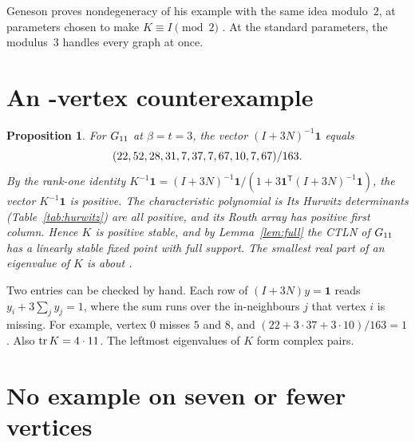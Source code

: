 \documentclass[11pt]{amsart}
\newtheorem{proposition}[theorem]{Proposition}
\theoremstyle{remark}
\newcommand{\one}{\mathbf 1}
\begin{document}
Geneson proves nondegeneracy of his example with the same idea modulo~$2$, at parameters chosen to make $K\equiv I\pmod2$ \cite{Geneson2026}. At the standard parameters, the modulus~$3$ handles every graph at once.

\section{An \NSMALL-vertex counterexample}\label{sec:small}

\begin{table}[ht]
\centering\small
\caption{The \MSMALL{} deleted arcs of $G_{\NSMALL}$. Each entry has the form $i\colon j_1,j_2,\dots$, meaning that vertex $i$ receives no arc from $j_1,j_2,\dots$. Every other ordered pair of distinct vertices is an arc. The same data is in \texttt{verification/examples/G\NSMALL.json}.}
\label{tab:small}
\SMALLTABLE
\end{table}

\begin{proposition}\label{prop:small}
For $G_{\NSMALL}$ at $\beta=t=3$, the vector $(I+3N)^{-1}\one$ equals
\[(22,52,28,31,7,37,7,67,10,7,67)/163.\] By the rank-one identity $K^{-1}\one=(I+3N)^{-1}\one/(1+3\one^{\mathsf T}(I+3N)^{-1}\one)$, the vector $K^{-1}\one$ is positive. The characteristic polynomial is
\CPFULL
Its Hurwitz determinants (Table~\ref{tab:hurwitz}) are all positive, and its Routh array has positive first column. Hence $K$ is positive stable, and by Lemma~\ref{lem:full} the CTLN of $G_{\NSMALL}$ has a linearly stable fixed point with full support. The smallest real part of an eigenvalue of $K$ is about \MINRE.
\end{proposition}

\begin{table}[ht]
\centering\small
\caption{Hurwitz determinants of $\det(zI+K)$ for $G_{\NSMALL}$ (also in \texttt{verification/examples/G\NSMALL\_certificate.json}).}
\label{tab:hurwitz}
\HURWTAB
\end{table}

Two entries can be checked by hand. Each row of $(I+3N)y=\one$ reads $y_i+3\sum_j y_j=1$, where the sum runs over the in-neighbours $j$ that vertex $i$ is missing. For example, vertex $0$ misses $5$ and $8$, and $(22+3\cdot37+3\cdot10)/163=1$. Also $\operatorname{tr}K=4\cdot11$. The leftmost eigenvalues of $K$ form complex pairs.

\section{No example on seven or fewer vertices}\label{sec:exhaust}
\end{document}
